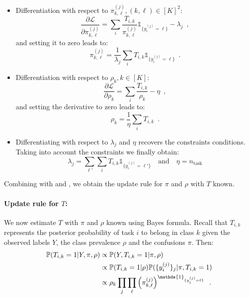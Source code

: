 \begin{itemize}
    \item Differentiation with respect to $\pi^{(j)}_{k,\ell}, (k,\ell)\in[K]^2$:
    \begin{equation*}
        \frac{\partial \mathcal{L}}{\partial \pi^{(j)}_{k,\ell}} = \sum_i \frac{T_{i,k}}{\pi^{(j)}_{k,\ell}} \mathds{1}_{\{y_i^{(j)}=\ell\}} - \lambda_j \enspace,
    \end{equation*}
    and setting it to zero leads to:
        \begin{equation}\label{eq:em_pi}
       \pi^{(j)}_{k,\ell} = \frac{1}{\lambda_j}\sum_i T_{i,k}\mathds{1}_{\{y_i^{(j)}=\ell\}}\enspace.
    \end{equation}
    \item Differentiation with respect to $\rho_k, k\in[K]$:
    \begin{equation*}
        \frac{\partial \mathcal{L}}{\partial \rho_k} = \sum_{i}\frac{T_{i,k}}{\rho_k} - \eta\enspace,
    \end{equation*}
    and setting the derivative to zero leads to:
    \begin{equation}\label{eq:em_rho}
        \rho_k = \frac{1}{\eta} \sum_i T_{i,k} \enspace.
    \end{equation}
    \item Differentiating with respect to $\lambda_j$ and $\eta$ recovers the constraints conditions.
    Taking into account the constraints we finally obtain:
    \begin{equation}\label{eq:constraints_em_ds}
        \lambda_j = \sum_{\ell'} \sum_i T_{i,k} \mathds{1}_{\{y_i^{(j)}=\ell'\}} \quad \text{and}\quad \eta = n_{\text{task}}
    \end{equation}
\end{itemize}
Combining  with  and , we obtain the update rule for $\pi$ and $\rho$ with $T$ known.

\paragraph{Update rule for $T$: }We now estimate $T$ with $\pi$ and $\rho$ known using Bayes formula. Recall that $T_{i,k}$ represents the posterior probability of task $i$ to belong in class $k$ given the observed labels $Y$, the class prevalence $\rho$ and the confusions $\pi$. Then:
\begin{align}\label{eq:ds_update_T}
    \mathbb{P}(T_{i,k}=1|Y,\pi,\rho)
    & \propto \mathbb{P}(Y,T_{i,k}=1|\pi,\rho) \notag\\
    & \propto  \mathbb{P}(T_{i,k}=1|\rho) \mathbb{P}(\{y_i^{(j)}\}_j|\pi, T_{i,k}=1) \notag\\
    & \propto \rho_k \prod_j\prod_\ell \left(\pi^{(j)}_{k,\ell}\right)^{\mathds{1}_{\{y_i^{(j)}=\ell\}}} \enspace.
\end{align}

